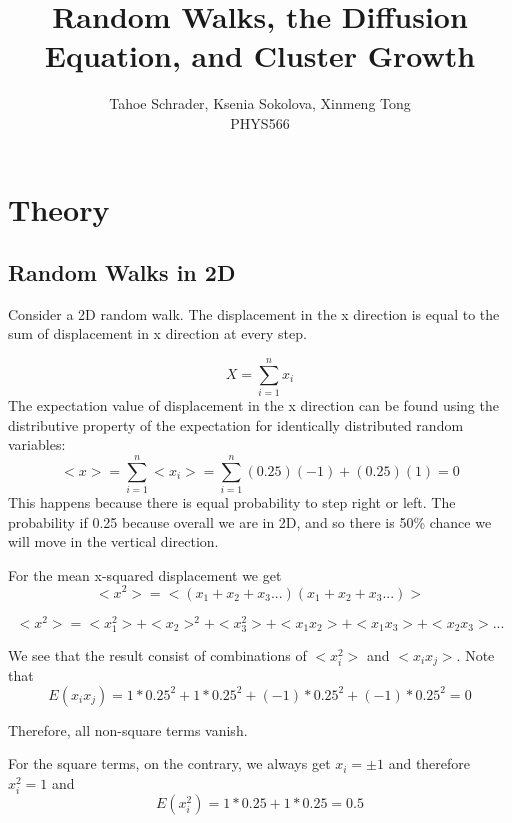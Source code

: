 \documentclass[12pt]{article}
\title{Random Walks, the Diffusion Equation, and Cluster Growth}
\author{Tahoe Schrader, Ksenia Sokolova, Xinmeng Tong \\PHYS566}
\date{}
\begin{document}
\maketitle


\section{Theory}
\label{sec:theory}

\subsection{Random Walks in 2D}
Consider a 2D random walk. The displacement in the x direction is equal to the sum of displacement in x direction at every step.

\begin{equation}
    X=\sum_{i=1}^{n} x_i
\end{equation}
The expectation value of displacement in the x direction can be found using the distributive property of the expectation for identically distributed random variables:
\begin{equation}
    <x>=\sum_{i=1}^{n} <x_i>=\sum_{i=1}^{n} (0.25)(-1)+(0.25)(1)=0
\end{equation}
This happens because there is equal probability to step right or left. The probability if 0.25 because overall we are in 2D, and so there is 50\% chance we will move in the vertical direction.

For the mean x-squared displacement we get
\begin{equation}
    <x^2>=<(x_1+x_2+x_3...)(x_1+x_2+x_3...)>
\end{equation}

\begin{equation}
    <x^2>=<x_1^2>+<x_2>^2+<x_3^2>+<x_1x_2>+<x_1x_3>+<x_2x_3>...
\end{equation}

We see that the result consist of combinations of $<x_i^2>$ and $<x_ix_j>$. Note that
\begin{equation}
    E(x_ix_j)=1*0.25^2+1*0.25^2+(-1)*0.25^2+(-1)*0.25^2=0
\end{equation}

Therefore, all non-square terms vanish.

For the square terms, on the contrary, we always get $x_i=\pm 1$ and therefore $x_i^2=1$ and
\begin{equation}
    E(x_i^2)=1*0.25+1*0.25=0.5
\end{equation}
\end{document}
